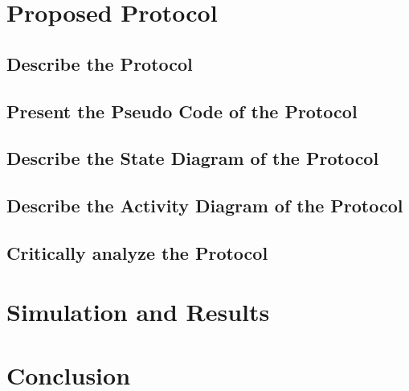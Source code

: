 \documentclass[10pt]{llncs}
\begin{document}
%
\section{Proposed Protocol}

%
\subsection{Describe the Protocol}

%
\subsection{Present the Pseudo Code of the Protocol}

%
\subsection{Describe the State Diagram of the Protocol}

%
\subsection{Describe the Activity Diagram of the Protocol}


%
\subsection{Critically analyze the Protocol}



%
\section{Simulation and Results}


%
\section{Conclusion}
 
%

%

\footnotesize{
%
%
}
%
\end{document}
